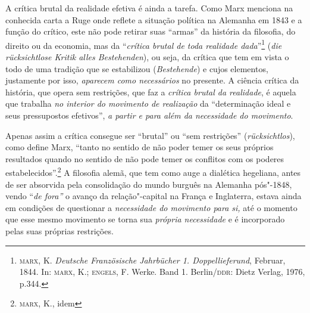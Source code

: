 A crítica brutal da realidade efetiva é ainda a tarefa. Como Marx
menciona na conhecida carta a Ruge onde reflete a situação política na
Alemanha em 1843 e a função do crítico, este não pode retirar suas
``armas'' da história da filosofia, do direito ou da economia, mas da
``\emph{crítica brutal de toda realidade dada}''\footnote{\textsc{marx},
  K. \emph{Deutsche Französische Jahrbücher 1. Doppellieferund},
  Februar, 1844. In: \textsc{marx}, K.; \textsc{engels}, F. Werke. Band
  1. Berlin/\textsc{ddr}: Dietz Verlag, 1976, p.344.} (\emph{die
rücksichtlose Kritik alles Bestehenden}), ou seja, da crítica que tem em
vista o todo de uma tradição que se estabilizou (\emph{Bestehende}) e
cujos elementos, justamente por isso, \emph{aparecem como necessários}
no presente. A ciência crítica da história, que opera sem restrições,
que faz a \emph{crítica brutal da realidade}, é aquela que trabalha
\emph{no interior do movimento de realização} da ``determinação ideal e
seus pressupostos efetivos'', \emph{a partir e para além da necessidade
do movimento}.

Apenas assim a crítica consegue ser ``brutal'' ou ``sem restrições''
(\emph{rücksichtlos}), como define Marx, ``tanto no sentido de não poder
temer os seus próprios resultados quando no sentido de não pode temer os
conflitos com os poderes estabelecidos''.\footnote{\textsc{marx}, K., idem}
A filosofia alemã, que tem como auge a dialética hegeliana, antes de ser
absorvida pela consolidação do mundo burguês na Alemanha pós"-1848,
vendo ``\emph{de fora''} o avanço da relação"-capital na França e
Inglaterra, estava ainda em condições de questionar a \emph{necessidade
do movimento para si,} até o momento que esse mesmo movimento se torna
sua \emph{própria necessidade} e é incorporado pelas suas próprias
restrições.


